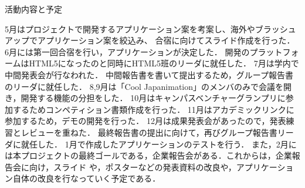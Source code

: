 \par
活動内容と予定
\par
5月はプロジェクトで開発するアプリケーション案を考案し、海外やブラッシュアップでアプリケーション案を絞込み、
合宿に向けてスライド作成を行った．
6月には第一回合宿を行い，アプリケーションが決定した．
開発のプラットフォームはHTML5になったのと同時にHTML5班のリーダに就任した．
7月は学内で中間発表会が行なわれた．
中間報告書を書いて提出するため，グループ報告書のリーダに就任した．
8,9月は「Cool Japanimation」のメンバのみで会議を開き，開発する機能の分担をした．
10月はキャンパスベンチャーグランプリに参加するためコンペティション書類作成を行った．
11月はアカデミックリンクに参加するため，デモの開発を行った．
12月は成果発表会があったので，発表練習とレビューを重ねた．
最終報告書の提出に向けて，再びグループ報告書リーダに就任した．
1月で作成したアプリケーションのテストを行う．
また，2月には本プロジェクトの最終ゴールである，企業報告会がある．これからは，企業報告会に向け，スライド
や，ポスターなどの発表資料の改良や，アプリケーション自体の改良を行なっていく予定である．
